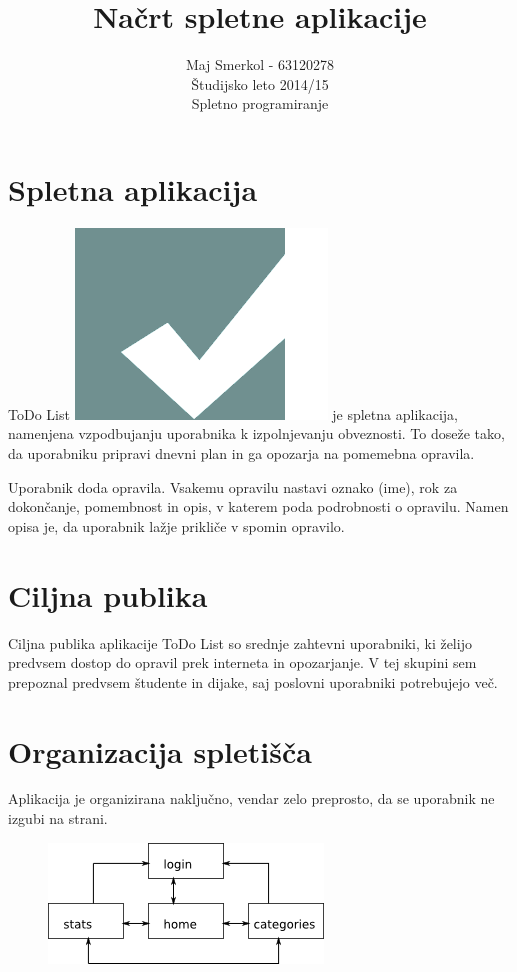 \documentclass[12pt]{article}
\title{\textbf{Načrt spletne aplikacije}}
\author{Maj Smerkol  - 63120278\\
Študijsko leto 2014/15 \\
Spletno programiranje}
\begin{document}
\maketitle

\section{Spletna aplikacija}
ToDo List \includegraphics[scale=0.1]{todo_logo.png} je spletna aplikacija, namenjena vzpodbujanju uporabnika k izpolnjevanju obveznosti. To doseže tako, da uporabniku pripravi dnevni plan in ga opozarja na pomemebna opravila.

Uporabnik doda opravila. Vsakemu opravilu nastavi oznako (ime), rok za dokončanje, pomembnost in opis, v katerem poda podrobnosti o opravilu. Namen opisa je, da uporabnik lažje prikliče v spomin opravilo.

\section{Ciljna publika}
Ciljna publika aplikacije ToDo List so srednje zahtevni uporabniki, ki želijo predvsem dostop do opravil prek interneta in opozarjanje. V tej skupini sem prepoznal predvsem študente in dijake, saj poslovni uporabniki potrebujejo več.

\section{Organizacija spletišča}
Aplikacija je organizirana naključno, vendar zelo preprosto, da se uporabnik ne izgubi na strani.

\begin{figure}\centering
	\includegraphics[scale=1]{sitemap01.png}
\end{figure}
\end{document}
